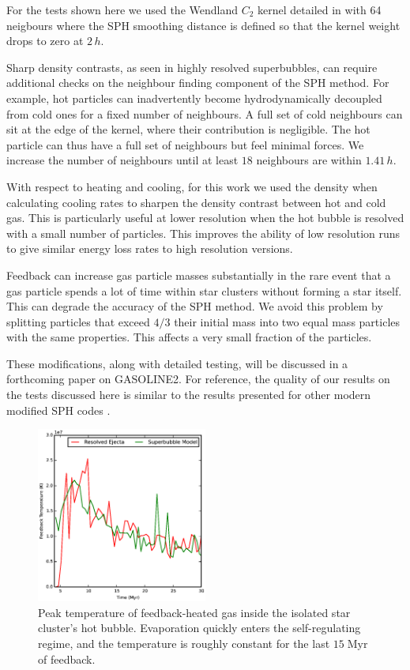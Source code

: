 For the tests shown here we used the Wendland $C_2$ kernel detailed in
\citet{Dehnen2012} with 64 neigbours where the SPH smoothing distance is defined
so that the kernel weight drops to zero at $2\,h$.  

Sharp density contrasts, as seen in highly resolved superbubbles, can require
additional checks on the neighbour finding component of the SPH method.  For
example, hot particles can inadvertently become hydrodynamically decoupled from
cold ones for a fixed number of neighbours.  A full set of cold neighbours can
sit at the edge of the kernel, where their contribution is negligible.  The hot
particle can thus have a full set of neighbours but feel minimal forces.  We
increase the number of neighbours until at least $18$ neighbours are within
$1.41\,h$.  

With respect to heating and cooling, for this work we used the
\citet{Ritchie2001} density when calculating cooling rates to sharpen the
density contrast between hot and cold gas.  This is particularly useful at lower
resolution when the hot bubble is resolved with a small number of particles.
This improves the ability of low resolution runs to give similar energy loss
rates to high resolution versions.
 
Feedback can increase gas particle masses substantially in the rare event that a
gas particle spends a lot of time within star clusters without forming a star
itself.  This can degrade the accuracy of the SPH method.  We avoid this problem
by splitting particles that exceed $4/3$ their initial mass into two equal mass
particles with the same properties.  This affects a very small fraction of the
particles.

These modifications, along with detailed testing, will be discussed in a
forthcoming paper on {\sc GASOLINE2}.  For reference, the quality of our results
on the tests discussed here is similar to the results presented for other modern
modified SPH codes \citep[e.g.][]{Hopkins2013}. 

\begin{figure}
    \includegraphics[width=0.5\textwidth]{figures1/onestar_hottemp.eps}
    \caption[Peak temperature of feedback-heated gas in a superbubble]{Peak
    temperature of feedback-heated gas inside the isolated star cluster's hot
    bubble.  Evaporation quickly enters the self-regulating regime, and the
    temperature is roughly constant for the last $15\;\mathrm{Myr}$ of
    feedback.}
    \label{onestar_hottemp}
\end{figure}


